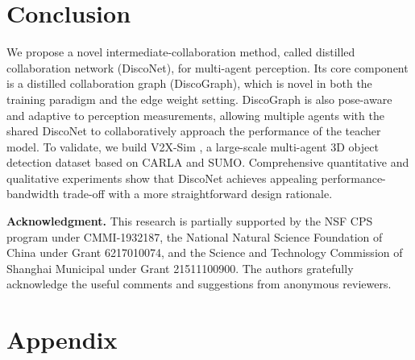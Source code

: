 \documentclass{article}
\begin{document}
\vspace{-3.5mm}
\section{Conclusion}\label{sec:conclusion}
\vspace{-2.5mm}
We propose a novel intermediate-collaboration method, called distilled collaboration network (DiscoNet), for multi-agent perception. Its core component is a distilled collaboration graph (DiscoGraph), which is novel in both the training paradigm and the edge weight setting. DiscoGraph is also pose-aware and adaptive to perception measurements, allowing multiple agents with the shared DiscoNet to collaboratively approach the performance of the teacher model. To validate, we build V2X-Sim , a large-scale multi-agent 3D object detection dataset based on CARLA and SUMO. Comprehensive quantitative and qualitative experiments show that DiscoNet achieves appealing performance-bandwidth trade-off with a more straightforward design rationale. 

\textbf{Acknowledgment.} This research is partially supported by the NSF CPS program under CMMI-1932187, the National Natural Science Foundation of China under Grant 6217010074, and the Science and Technology Commission of Shanghai Municipal under Grant 21511100900. The authors gratefully acknowledge the useful comments and suggestions from anonymous reviewers.


{\small


}
\clearpage

\renewcommand{\thetable}{\Roman{table}}
\renewcommand{\thefigure}{\Roman{figure}}
\renewcommand\thesection{\Roman {section}}

\section*{Appendix}
\setcounter{section}{0}
\setcounter{figure}{0}
\setcounter{table}{0}
\end{document}
